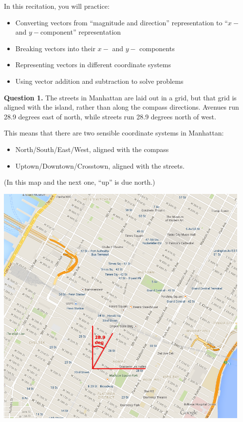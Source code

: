 \documentclass[12pt]{article}
\newcommand{\BI}{\begin{itemize}}
\newcommand{\EI}{\end{itemize}}
\def\BS{\bigskip}
\begin{document}
\Large
\centerline{}
\normalsize
\centerline{}


\rmfamily

\medskip

\rm In this recitation, you will practice:

\BI
\item Converting vectors from ``magnitude and direction'' representation to ``$x-$ and $y-$component'' representation
\item Breaking vectors into their $x-$ and $y-$ components
\item Representing vectors in different coordinate systems
\item Using vector addition and subtraction to solve problems
\EI
\newpage
\begin{minipage}{0.4\textwidth}
{\bf Question 1.} The streets in Manhattan are laid out in a grid, but that grid is aligned with the island, rather than along the compass directions. Avenues run 28.9 degrees east of north, while streets run 28.9 degrees north of west. 

\BS

This means that there are two sensible coordinate systems in Manhattan:


\BI
\item North/South/East/West, aligned with the compass
\item Uptown/Downtown/Crosstown, aligned with the streets.
\EI
	(In this map and the next one, “up” is due north.)

\end{minipage}
\begin{minipage}{0.6\textwidth}
	\begin{center}
	
	
	\includegraphics[width=0.95\textwidth]{manhattan-1.png}
	

\end{center}
\end{minipage}
\BS\BS
\end{document}
